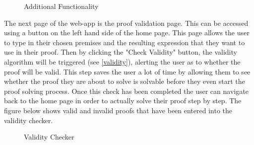 \begin{figure}[!ht]
	\centering
	\caption{Additional Functionality}
\end{figure}

The next page of the web-app is the proof validation page. This can be accessed using a button on the left hand side of the home page. This page allows the user to type in their chosen premises and the resulting expression that they want to use in their proof. Then by clicking the "Check Validity" button, the validity algorithm will be triggered (see \ref{validity}), alerting the user as to whether the proof will be valid. This step saves the user a lot of time by allowing them to see whether the proof they are about to solve is solvable before they even start the proof solving process. Once this check has been completed the user can navigate back to the home page in order to actually solve their proof step by step. The figure below shows valid and invalid proofs that have been entered into the validity checker.

\begin{figure}[!ht]
	\centering
	\caption{Validity Checker}
\end{figure}

